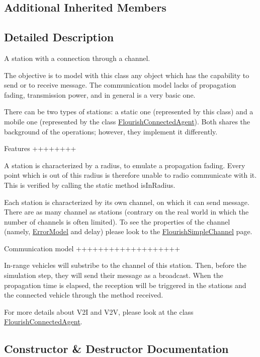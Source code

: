 \subsection*{Additional Inherited Members}


\subsection{Detailed Description}
A station with a connection through a channel. 

The objective is to model with this class any object which has the capability to send or to receive message. The communication model lacks of propagation fading, transmission power, and in general is a very basic one.

There can be two types of stations\+: a static one (represented by this class) and a mobile one (represented by the class \hyperlink{classFlourishConnectedAgent}{Flourish\+Connected\+Agent}). Both shares the background of the operations; however, they implement it differently.

Features ++++++++

A station is characterized by a radius, to emulate a propagation fading. Every point which is out of this radius is therefore unable to radio communicate with it. This is verified by calling the static method is\+In\+Radius.

Each station is characterized by its own channel, on which it can send message. There are as many channel as stations (contrary on the real world in which the number of channels is often limited). To see the properties of the channel (namely, \hyperlink{classErrorModel}{Error\+Model} and delay) please look to the \hyperlink{classFlourishSimpleChannel}{Flourish\+Simple\+Channel} page.

Communication model +++++++++++++++++++

In-\/range vehicles will substribe to the channel of this station. Then, before the simulation step, they will send their message as a broadcast. When the propagation time is elapsed, the reception will be triggered in the stations and the connected vehicle through the method received.

For more details about V2I and V2V, please look at the class \hyperlink{classFlourishConnectedAgent}{Flourish\+Connected\+Agent}. 

\subsection{Constructor \& Destructor Documentation}
